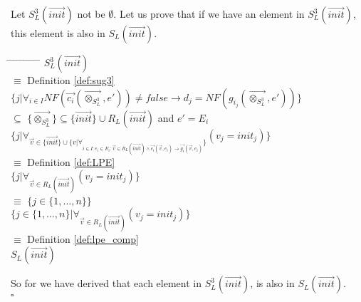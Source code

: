 \documentclass[a4paper,10pt]{article}
\theoremstyle{plain}
\theoremstyle{definition}
\newcommand{\ovr}{\overrightarrow}
\newcommand{\sq}{$\square$}
\begin{document}
\begin{defn}
Let $S_L^3(\ovr{init})$ not be $\emptyset$. Let us prove that if we have an element in $S_L^3(\ovr{init})$, this element is also in $S_L(\ovr{init})$.
\begin{tabbing}
\hspace*{5.mm} \= \hspace*{5.mm} \= \hspace*{5.mm} \= \hspace*{5.mm} \= \hspace*{5.mm} \= \hspace*{5.mm}  \= \hspace*{5.mm}  \= \hspace*{5.mm}  \= \hspace*{5.mm} \= \hspace*{5.mm} \= \hspace*{5.mm}\kill
\> \> $S_L^3(\ovr{init})$\\
\> $\equiv$ \> \> Definition \ref{def:sug3}\\
\> \> $\lbrace j \vert \forall_{i \in I} NF(\ovr{c_i}( \ovr{\otimes_{S_L^3}}, e')) \neq false \rightarrow d_j = NF(g_{i_j} (\ovr{\otimes_{S_L^3}}, e' ))  \rbrace$\\
\> $\subseteq$\> \> $ \lbrace \ovr{\otimes_{S_L^3}} \rbrace \subseteq \lbrace \ovr{init} \rbrace \cup R_L(\ovr{init})$
and $e' = E_i$ \\
\> \> $\lbrace j \vert \forall_{\ovr{v} \in \lbrace \ovr{init} \rbrace \cup \lbrace v \vert \forall_{i \in I: e_i \in E_i : \ovr{v} \in R_L(\ovr{init}) \wedge \ovr{c_i}(\ovr{v}, e_i) \rightarrow \ovr{g_i}(\ovr{v}, e_i)} \rbrace } (v_j = init_j) \rbrace$ \\
\> $\equiv$ \> \>Definition \ref{def:LPE}\\
\> \> $\lbrace j \vert \forall_{\ovr{v} \in R_L(\ovr{init})} (v_j = init_j) \rbrace$\\
\> $\equiv$ \> \>$\lbrace j \in \lbrace 1, \ldots, n \rbrace \rbrace  $\\
\> \> $\lbrace j \in \lbrace 1, \ldots, n \rbrace \vert \forall_{\ovr{v} \in R_L(\ovr{init})} (v_j = init_j) \rbrace$\\
\> $\equiv$ \> \>Definition \ref{def:lpe_comp}\\
\> \> $S_L(\ovr{init})$
\end{tabbing}
So for we have derived that each element in $S_L^3(\ovr{init})$, is also in $S_L(\ovr{init})$.
\\ \sq
\end{defn}
\end{document}
